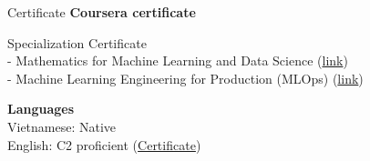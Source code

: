 \documentclass{resume} %
\begin{document}




\begin{rSection}{Certificate}
{\bf Coursera certificate }

Specialization Certificate 
\\ - Mathematics for Machine Learning and Data Science (\href{https://coursera.org/share/ae3f40effbceedf3488075d566a95551}{link})
\\ - Machine Learning Engineering for Production (MLOps) (\href{https://coursera.org/share/ce5ec378a0075b8ffdbd5b235f8a84bd}{link})


{\bf Languages}
\\Vietnamese: Native
\\English: C2 proficient (\href{https://www.efset.org/cert/o5HAWP}{Certificate})
\end{rSection}




\end{document}
